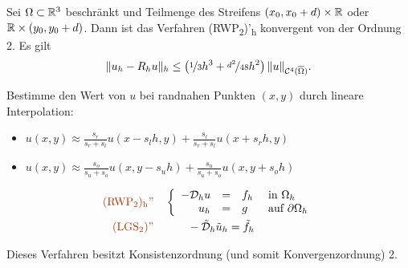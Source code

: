 \documentclass{cheat-sheet}
\newcommand{\Cont}{\mathcal{C}} %
\newcommand{\clos}[1]{\overline{#1}} %
\newcommand{\cOmega}{\clos{\Omega}} %
\newcommand{\bOmega}{\partial \Omega} %
\newcommand{\tss}[1]{\textsubscript{#1}} %
\newcommand{\DO}{\mathcal{D}} %
\newcommand{\probl}[1]{\textcolor{ProblemColor}{#1}}
\begin{document}
\begin{satz}
  Sei $\Omega \subset \mathbb{R}^3$ beschränkt und Teilmenge des Streifens $\left( x_0, x_0 + d \right) \times \mathbb{R}$ oder $\mathbb{R} \times (y_0, y_0 + d)$.
  Dann ist das Verfahren (RWP\tss{2})'\tss{h} konvergent von der Ordnung 2.
  Es gilt
  \[ \norm{u_h - R_h u}_h \leq \left( \nicefrac{1}{3} h^3 + \nicefrac{d^2}{48} h^2 \right) \norm{u}_{\Cont^4(\cOmega)}. \]
\end{satz}



\begin{idee}
  Bestimme den Wert von $u$ bei randnahen Punkten $(x, y)$ durch lineare Interpolation:
  \begin{itemize}
    \item $u(x, y) \approx \frac{s_r}{s_r + s_l} u(x - s_l h, y) + \frac{s_l}{s_r + s_l} u(x+s_r h, y)$
    \item $u(x, y) \approx \frac{s_o}{s_u + s_o} u(x, y - s_u h) + \frac{s_u}{s_u + s_o} u(x, y + s_o h)$
  \end{itemize}
\end{idee}

\begin{align*}
  \text{\probl{(RWP\tss{2})\tss{h}''}} \quad
  & \left\{ \begin{array}{rlll}
    - \DO_h u &=& f_h &\text{ in $\Omega_h$} \\
    u_h &=& g &\text{ auf $\bOmega_h$}
  \end{array} \right. \\
  \text{\probl{(LGS\tss{2})''}} \quad
  & \qquad - \tilde{\DO}_h \tilde{u}_h = \tilde{f}_h
\end{align*}

\begin{lem}
  Dieses Verfahren besitzt Konsistenzordnung (und somit Konvergenzordnung) 2.
\end{lem}

\iffalse
Konsistenz: Mit Taylorn ...

\begin{itemize}
  \item \[ -s_r u_h(x - s_l h, y) + (s_r + s_l) u_h(x, y) - s_l u(x + s_r h, y) = 0 \]
  \item \[ -s_o u_h(x, y - s_u h) + (s_o + s_u) u_h(x, y) - s_u u(x, y + s_o h) = 0 \]
\end{itemize}
\fi

\end{document}
